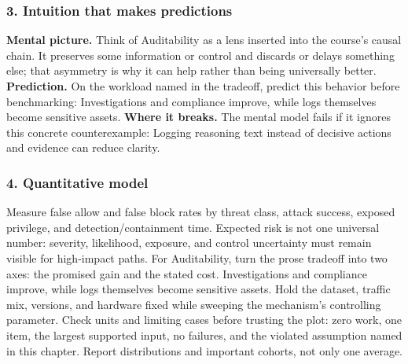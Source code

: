 \subsubsection*{3. Intuition that makes predictions}
\textbf{Mental picture.} Think of Auditability as a lens inserted into the course's causal chain. It preserves some information or control and discards or delays something else; that asymmetry is why it can help rather than being universally better.
\textbf{Prediction.} On the workload named in the tradeoff, predict this behavior before benchmarking: Investigations and compliance improve, while logs themselves become sensitive assets.
\textbf{Where it breaks.} The mental model fails if it ignores this concrete counterexample: Logging reasoning text instead of decisive actions and evidence can reduce clarity.
\subsubsection*{4. Quantitative model}
Measure false allow and false block rates by threat class, attack success, exposed privilege, and detection/containment time. Expected risk is not one universal number: severity, likelihood, exposure, and control uncertainty must remain visible for high-impact paths.
For Auditability, turn the prose tradeoff into two axes: the promised gain and the stated cost. Investigations and compliance improve, while logs themselves become sensitive assets. Hold the dataset, traffic mix, versions, and hardware fixed while sweeping the mechanism's controlling parameter.
Check units and limiting cases before trusting the plot: zero work, one item, the largest supported input, no failures, and the violated assumption named in this chapter. Report distributions and important cohorts, not only one average.

